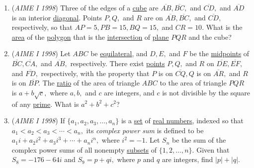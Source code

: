 \begin{enumerate}
	\item (\textit{AIME I 1998}) Three of the edges of a \href{https://artofproblemsolving.com/wiki/index.php?title=Cube}{cube} are $\overline{AB}, \overline{BC},$ and $\overline{CD},$ and $\overline{AD}$ is an interior \href{https://artofproblemsolving.com/wiki/index.php?title=Diagonal}{diagonal}.  Points $P, Q,$ and $R$ are on $\overline{AB}, \overline{BC},$ and $\overline{CD},$ respectively, so that $AP = 5, PB = 15, BQ = 15,$ and $CR = 10.$  What is the \href{https://artofproblemsolving.com/wiki/index.php?title=Area}{area} of the \href{https://artofproblemsolving.com/wiki/index.php?title=Polygon}{polygon} that is the \href{https://artofproblemsolving.com/wiki/index.php?title=Intersection}{intersection} of \href{https://artofproblemsolving.com/wiki/index.php?title=Plane}{plane} $PQR$ and the cube?


 

	\item (\textit{AIME I 1998}) Let $ABC$ be \href{https://artofproblemsolving.com/wiki/index.php?title=Equilateral\_triangle}{equilateral}, and $D, E,$ and $F$ be the \href{https://artofproblemsolving.com/wiki/index.php?title=Midpoint}{midpoints} of $\overline{BC}, \overline{CA},$ and $\overline{AB},$ respectively.  There exist \href{https://artofproblemsolving.com/wiki/index.php?title=Point}{points} $P, Q,$ and $R$ on $\overline{DE}, \overline{EF},$ and $\overline{FD},$ respectively, with the property that $P$ is on $\overline{CQ}, Q$ is on $\overline{AR},$ and $R$ is on $\overline{BP}.$  The \href{https://artofproblemsolving.com/wiki/index.php?title=Ratio}{ratio} of the area of triangle $ABC$ to the area of triangle $PQR$ is $a + b\sqrt {c},$ where $a, b,$ and $c$ are integers, and $c$ is not divisible by the square of any \href{https://artofproblemsolving.com/wiki/index.php?title=Prime}{prime}.  What is $a^{2} + b^{2} + c^{2}$?


 

	\item (\textit{AIME I 1998}) If $\{a_1,a_2,a_3,\ldots,a_n\}$ is a \href{https://artofproblemsolving.com/wiki/index.php?title=Set}{set} of \href{https://artofproblemsolving.com/wiki/index.php?title=Real\_numbers}{real numbers}, indexed so that $a_1 < a_2 < a_3 < \cdots < a_n,$ its \textit{complex power sum} is defined to be $a_1i + a_2i^2+ a_3i^3 + \cdots + a_ni^n,$ where $i^2 = - 1.$  Let $S_n$ be the sum of the complex power sums of all nonempty \href{https://artofproblemsolving.com/wiki/index.php?title=Subset}{subsets} of $\{1,2,\ldots,n\}.$  Given that $S_8 = - 176 - 64i$ and $S_9 = p + qi,$ where $p$ and $q$ are integers, find $\left\lvert p\right\rvert + \left\lvert q\right\rvert.$



\end{enumerate}
